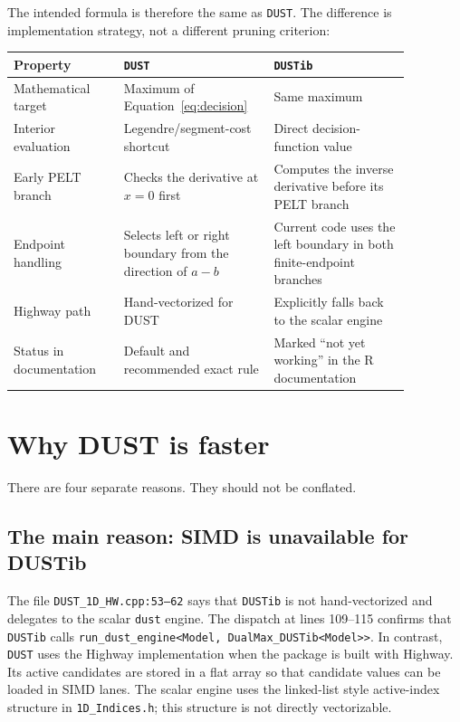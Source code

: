 \documentclass[11pt]{article}
\begin{document}
The intended formula is therefore the same as \texttt{DUST}.  The difference
is implementation strategy, not a different pruning criterion:

\begin{center}
\small
\begin{tabular}{p{0.25\linewidth}p{0.31\linewidth}p{0.31\linewidth}}
\toprule
Property & \texttt{DUST} & \texttt{DUSTib} \\
\midrule
Mathematical target & Maximum of Equation~\eqref{eq:decision} & Same maximum \\
Interior evaluation & Legendre/segment-cost shortcut & Direct decision-function value \\
Early PELT branch & Checks the derivative at $x=0$ first & Computes the inverse derivative before its PELT branch \\
Endpoint handling & Selects left or right boundary from the direction of $a-b$ & Current code uses the left boundary in both finite-endpoint branches \\
Highway path & Hand-vectorized for DUST & Explicitly falls back to the scalar engine \\
Status in documentation & Default and recommended exact rule & Marked ``not yet working'' in the R documentation \\
\bottomrule
\end{tabular}
\end{center}

\section{Why DUST is faster}

There are four separate reasons.  They should not be conflated.

\subsection{The main reason: SIMD is unavailable for DUSTib}

The file \texttt{DUST\_1D\_HW.cpp:53--62} says that \texttt{DUSTib} is not
hand-vectorized and delegates to the scalar \texttt{dust} engine.  The
dispatch at lines 109--115 confirms that \texttt{DUSTib} calls
\texttt{run\_dust\_engine<Model, DualMax\_DUSTib<Model>>}.  In contrast,
\texttt{DUST} uses the Highway implementation when the package is built with
Highway.  Its active candidates are stored in a flat array so that candidate
values can be loaded in SIMD lanes.  The scalar engine uses the linked-list
style active-index structure in \texttt{1D\_Indices.h}; this structure is not
directly vectorizable.
\end{document}

